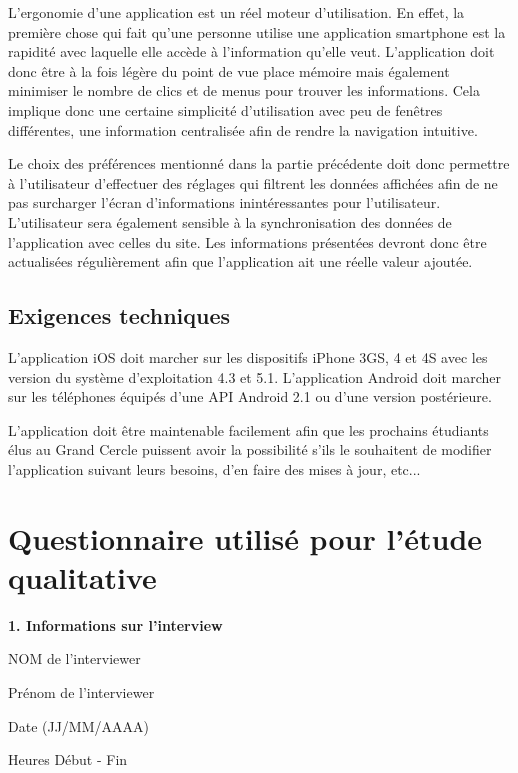 \documentclass[a4paper, 11px]{article}
\begin{document}
L'ergonomie d'une application est un réel moteur d'utilisation. En effet, la première chose qui fait qu'une personne utilise une application smartphone est la rapidité avec laquelle elle accède à l'information qu'elle veut. L'application doit donc être à la fois légère du point de vue place mémoire mais également minimiser le nombre de clics et de menus pour trouver les informations. Cela implique donc une certaine simplicité d'utilisation avec peu de fenêtres différentes, une information centralisée afin de rendre la navigation intuitive. 

Le choix des préférences mentionné dans la partie précédente doit donc permettre à l'utilisateur d'effectuer des réglages qui filtrent les données affichées afin de ne pas surcharger l'écran d'informations inintéressantes pour l'utilisateur.\\
\indent L'utilisateur sera également sensible à la synchronisation des données de l'application avec celles du site. Les informations présentées devront donc être actualisées régulièrement afin que l'application ait une réelle valeur ajoutée.

\subsection{Exigences techniques}
L'application iOS doit marcher sur les dispositifs iPhone 3GS, 4 et 4S avec les version du système d'exploitation 4.3 et 5.1. L'application Android doit marcher sur les téléphones équipés d'une API Android 2.1 ou d'une version postérieure.

L'application doit être maintenable facilement afin que les prochains étudiants élus au Grand Cercle puissent avoir la possibilité s'ils le souhaitent de modifier l'application suivant leurs besoins, d'en faire des mises à jour, etc...


\appendix
\addappheadtotoc

\newpage

\section{Questionnaire utilisé pour l'étude qualitative}
\label{q_qualitatif}

 \textbf {\large 1. Informations sur l'interview}

	NOM de l'interviewer
	
	Prénom de l'interviewer
	
	Date (JJ/MM/AAAA)
	
	Heures Début - Fin
	
\end{document}
